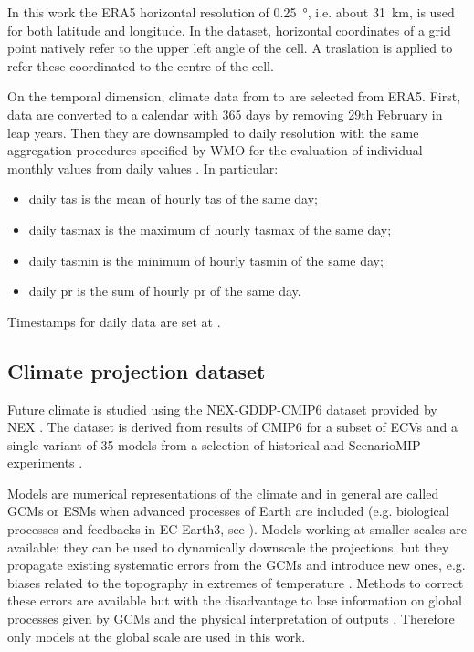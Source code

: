 In this work the ERA5 horizontal resolution of \qty{0.25}{\degree}, i.e. about \qty{31}{\kilo\metre}, is used for both latitude and longitude. In the dataset, horizontal coordinates of a grid point natively refer to the upper left angle of the cell. A traslation is applied to refer these coordinated to the centre of the cell.

On the temporal dimension, climate data from  to  are selected from ERA5. First, data are converted to a calendar with 365 days by removing 29th February in leap years. Then they are downsampled to daily resolution with the same aggregation procedures specified by \gls{WMO} for the evaluation of individual monthly values from daily values \cite[5]{2017WorldMeteorologicalOrganizationWMOWMOGuidelines}. In particular:
\begin{itemize}
  \item daily \glsdesc{tas} is the mean of hourly \glsdesc{tas} of the same day;
  \item daily \glsdesc{tasmax} is the maximum of hourly \glsdesc{tasmax} of the same day;
  \item daily \glsdesc{tasmin} is the minimum of hourly \glsdesc{tasmin} of the same day;
  \item daily \glsdesc{pr} is the sum of hourly \glsdesc{pr} of the same day.
\end{itemize}
Timestamps for daily data are set at .



\subsection{Climate projection dataset}
\label{sec:Climate projection dataset}
Future climate is studied using the NEX-GDDP-CMIP6 dataset provided by \gls{NEX} \cite{2022ThrasherNASAGlobal,2021ThrasherNEX-GDDP-CMIP6}. The dataset is derived from results of \gls{CMIP6} for a subset of \glspl{ECV} and a single variant of 35 models from a selection of historical and ScenarioMIP experiments \cite{2016EyringOverviewOf}.

Models are numerical representations of the climate and in general are called \glspl{GCM} or \glspl{ESM} when advanced processes of Earth are included (e.g. biological processes and feedbacks in EC-Earth3, see \cite{2022DoscherTheEC-Earth3}).
Models working at smaller scales are available: they can be used to dynamically downscale the projections, but they propagate existing systematic errors from the \glspl{GCM} and introduce new ones, e.g. biases related to the topography in extremes of temperature \cite[1551-1552]{2021SeneviratneWeatherAnd}. Methods to correct these errors are available but with the disadvantage to lose information on global processes given by \glspl{GCM} and the physical interpretation of outputs \cite{2012EhretHESSOpinions}. Therefore only models at the global scale are used in this work.

